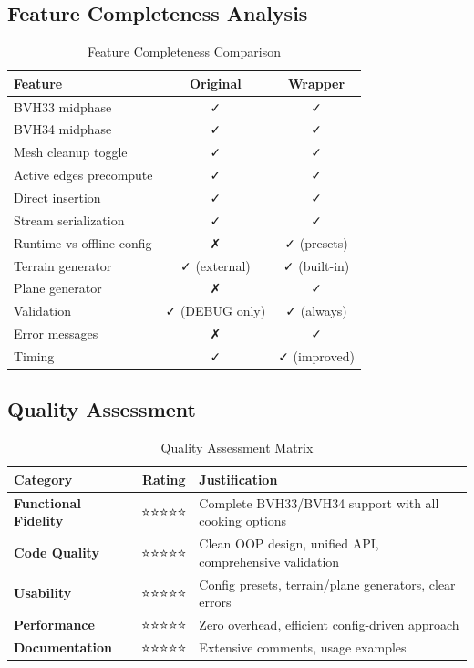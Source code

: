 
\subsection{Feature Completeness Analysis}

\begin{table}[h]
\centering
\small
\begin{tabular}{|p{6cm}|c|c|}
\hline
\textbf{Feature} & \textbf{Original} & \textbf{Wrapper} \\
\hline
BVH33 midphase & ✓ & ✓ \\
BVH34 midphase & ✓ & ✓ \\
Mesh cleanup toggle & ✓ & ✓ \\
Active edges precompute & ✓ & ✓ \\
Direct insertion & ✓ & ✓ \\
Stream serialization & ✓ & ✓ \\
Runtime vs offline config & ✗ & ✓ (presets) \\
Terrain generator & ✓ (external) & ✓ (built-in) \\
Plane generator & ✗ & ✓ \\
Validation & ✓ (DEBUG only) & ✓ (always) \\
Error messages & ✗ & ✓ \\
Timing & ✓ & ✓ (improved) \\
\hline
\end{tabular}
\caption{Feature Completeness Comparison}
\end{table}


\subsection{Quality Assessment}

\begin{table}[h]
\centering
\begin{tabular}{|l|c|p{7cm}|}
\hline
\textbf{Category} & \textbf{Rating} & \textbf{Justification} \\
\hline
\textbf{Functional Fidelity} & ⭐⭐⭐⭐⭐ & Complete BVH33/BVH34 support with all cooking options \\
\hline
\textbf{Code Quality} & ⭐⭐⭐⭐⭐ & Clean OOP design, unified API, comprehensive validation \\
\hline
\textbf{Usability} & ⭐⭐⭐⭐⭐ & Config presets, terrain/plane generators, clear errors \\
\hline
\textbf{Performance} & ⭐⭐⭐⭐⭐ & Zero overhead, efficient config-driven approach \\
\hline
\textbf{Documentation} & ⭐⭐⭐⭐⭐ & Extensive comments, usage examples \\
\hline
\end{tabular}
\caption{Quality Assessment Matrix}
\end{table}

